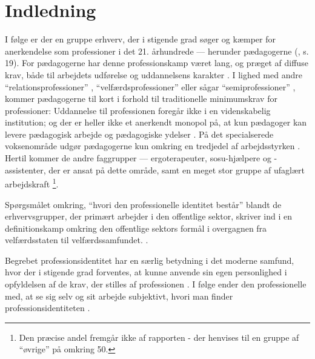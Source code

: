 \section{Indledning}

I følge \citeauthor{hansbolKonstruktionAfProfessionel2008} er der en gruppe erhverv, der i stigende grad søger og kæmper for anerkendelse som professioner i det 21. århundrede — herunder pædagogerne (\citeyear{hansbolKonstruktionAfProfessionel2008}, s. 19).
For pædagogerne har denne professionskamp været lang, og præget af diffuse krav, både til arbejdets udførelse og uddannelsens karakter \autocite[ss. 48-51] {kofodBornepolitikkenOgUdviklingen2007}.
I lighed med andre “relationsprofessioner” \autocite{moosRelationsprofessionerLaererePaedagoger2008}, “velfærdsprofessioner” \autocite{frederiksenVelfaerdsprofessionerMellemOmsorg2017} eller sågar “semiprofessioner”\autocite{kofodBornepolitikkenOgUdviklingen2007} , kommer pædagogerne til kort i forhold til traditionelle minimumskrav for professioner:
Uddannelse til professionen foregår ikke i en videnskabelig institution; og der er heller ikke et anerkendt monopol på, at kun pædagoger kan levere pædagogisk arbejde og pædagogiske ydelser \autocite[s.53]{kofodBornepolitikkenOgUdviklingen2007}.
På det specialserede voksenområde udgør pædagogerne kun omkring en tredjedel af arbejdsstyrken \autocite[ss. 8-9]{kommunerneslandsforeningFaktaOmKommunernes2019}.
Hertil kommer de andre faggrupper — ergoterapeuter, sosu-hjælpere og -assistenter, der er ansat på dette område, samt en meget stor gruppe af ufaglært arbejdskraft \footnote{Den præcise andel fremgår ikke af rapporten - der henvises til en gruppe af “øvrige” på omkring 50\percent \autocite[s. 8]{kommunerneslandsforeningFaktaOmKommunernes2019}.}.

Spørgsmålet omkring, “hvori den professionelle identitet består” blandt de erhvervsgrupper, der primært arbejder i den offentlige sektor, skriver \citeauthor{hansbolKonstruktionAfProfessionel2008} ind i en definitionskamp omkring den offentlige sektors formål i overgagnen fra velfærdsstaten til velfærdssamfundet.
\autocite[s. 19]{hansbolKonstruktionAfProfessionel2008}.

Begrebet professionsidentitet har en særlig betydning i det moderne samfund, hvor der i stigende grad forventes, at kunne anvende sin egen personlighed i opfyldelsen af de krav, der stilles af professionen \autocite{hansbolKonstruktionAfProfessionel2008}. I følge \citeauthor{mik-meyerIndledningSkabeProfessionel2012} ender den professionelle med, at se sig selv og sit arbejde subjektivt, hvori man finder professionsidentiteten \autocite[s. 458]{mik-meyerIndledningSkabeProfessionel2012}.

